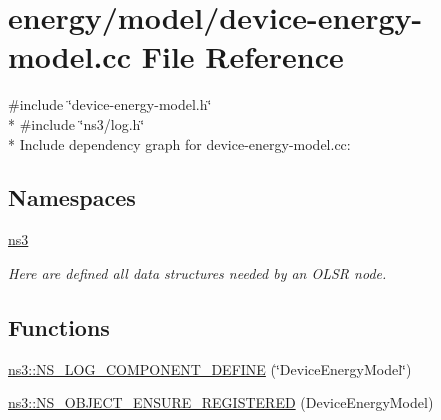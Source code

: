 \hypertarget{device-energy-model_8cc}{}\section{energy/model/device-\/energy-\/model.cc File Reference}
\label{device-energy-model_8cc}
{\ttfamily \#include \char`\"{}device-\/energy-\/model.\+h\char`\"{}}\\*
{\ttfamily \#include \char`\"{}ns3/log.\+h\char`\"{}}\\*
Include dependency graph for device-\/energy-\/model.cc\+:
\subsection*{Namespaces}
\begin{DoxyCompactItemize}
\item 
 \hyperlink{namespacens3}{ns3}
\begin{DoxyCompactList}\small\item\em Here are defined all data structures needed by an O\+L\+SR node. \end{DoxyCompactList}\end{DoxyCompactItemize}
\subsection*{Functions}
\begin{DoxyCompactItemize}
\item 
\hyperlink{namespacens3_ae902e746c2fa2cf780a0690875933154}{ns3\+::\+N\+S\+\_\+\+L\+O\+G\+\_\+\+C\+O\+M\+P\+O\+N\+E\+N\+T\+\_\+\+D\+E\+F\+I\+NE} (\char`\"{}Device\+Energy\+Model\char`\"{})
\item 
\hyperlink{namespacens3_acae0901fb8842689ea127fbf741e8ce4}{ns3\+::\+N\+S\+\_\+\+O\+B\+J\+E\+C\+T\+\_\+\+E\+N\+S\+U\+R\+E\+\_\+\+R\+E\+G\+I\+S\+T\+E\+R\+ED} (Device\+Energy\+Model)
\end{DoxyCompactItemize}
